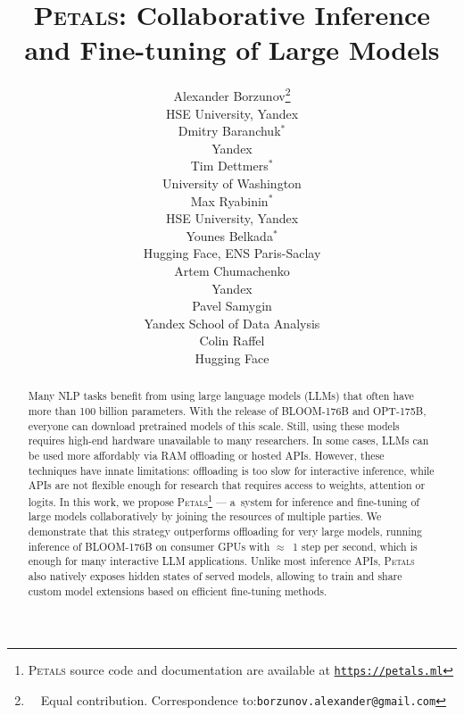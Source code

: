 \documentclass[11pt]{article}
\title{\textsc{Petals}: Collaborative Inference and Fine-tuning of Large Models}
\author{
  Alexander Borzunov\thanks{\ \ Equal contribution. Correspondence to:\newline \texttt{borzunov.alexander@gmail.com}}\\
  HSE University, Yandex \\\And
  Dmitry Baranchuk$^*$ \\
  Yandex \\\And
  Tim Dettmers$^*$ \\
  University of Washington\\\AND
  Max Ryabinin$^*$ \\
  HSE University, Yandex \\\And
  Younes Belkada$^*$ \\
  Hugging Face, ENS Paris-Saclay \\\And
  Artem Chumachenko \\
  Yandex \\\AND
  Pavel Samygin \\
  Yandex School of Data Analysis \\\And
  Colin Raffel \\
  Hugging Face
}
\begin{document}
\maketitle
\begin{abstract}
Many NLP tasks benefit from using large language models (LLMs) that often have more than 100 billion parameters. With the release of BLOOM-176B and OPT-175B, everyone can download pretrained models of this scale. Still, using these models requires high-end hardware unavailable to many researchers. In some cases, LLMs can be used more affordably via RAM offloading or hosted APIs. However, these techniques have innate limitations: offloading is too slow for interactive inference, while APIs are not flexible enough for research that requires access to weights, attention or logits. In this work, we propose \textsc{Petals}\footnote{\textsc{Petals} source code and documentation are available at \texttt{\href{https://petals.ml}{https://petals.ml}}} --- a~system for inference and fine-tuning of large models collaboratively by joining the resources of multiple parties. We demonstrate that this strategy outperforms offloading for very large models, running inference of BLOOM-176B on consumer GPUs with $\approx$~1 step per second, which is enough for many interactive LLM applications. Unlike most inference APIs, \textsc{Petals} also natively exposes hidden states of served models, allowing to train and share custom model extensions based on efficient fine-tuning methods.
\end{abstract}









\end{document}
